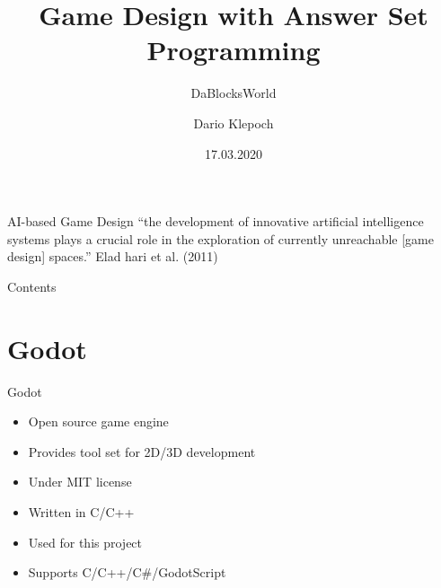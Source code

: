 \documentclass[12pt]{beamer}
\title{Game Design with Answer Set Programming}
\subtitle{DaBlocksWorld}
\author{Dario Klepoch}
\date{17.03.2020}
\institute{Universität Potsdam}
\begin{document}
    \lstset{
        language=prolog,
        autogobble=true 
    }

    \maketitle

    \begin{frame}[fragile]{AI-based Game Design}
        ``the development of innovative artificial intelligence systems plays a crucial role
        in the exploration of currently unreachable [game design] spaces.''
        \newline
        \newline
        \newline
        \newline
        \tiny{Elad hari et al. (2011)}
    \end{frame}
    
    \begin{frame}[fragile]{Contents}
        \tableofcontents[hidesubsections]
    \end{frame}


    \section{Godot}
        \begin{frame}[fragile]{Godot}
           \begin{itemize}
               \item Open source game engine
               \item Provides tool set for 2D/3D development
               \item Under MIT license
               \item Written in C/C++
               \item Used for this project
               \item Supports C/C++/C\#/GodotScript 
           \end{itemize} 
        \end{frame}
\end{document}
